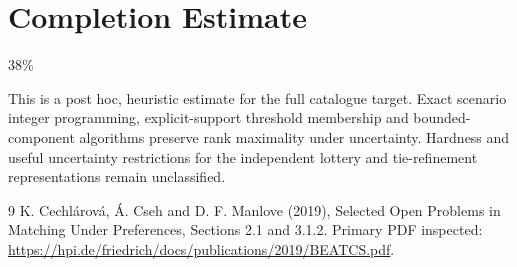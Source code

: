 \documentclass[11pt]{article}
\begin{document}
\section{Completion Estimate}
38\%

This is a post hoc, heuristic estimate for the full catalogue target.
Exact scenario integer programming, explicit-support threshold membership and bounded-component algorithms preserve rank maximality under uncertainty. Hardness and useful uncertainty restrictions for the independent lottery and tie-refinement representations remain unclassified.

\begin{thebibliography}{9}
 K. Cechl\'arov\'a, \'A. Cseh and D. F. Manlove (2019), Selected Open Problems in Matching Under Preferences, Sections 2.1 and 3.1.2. Primary PDF inspected:
\url{https://hpi.de/friedrich/docs/publications/2019/BEATCS.pdf}.
\end{thebibliography}
\end{document}
